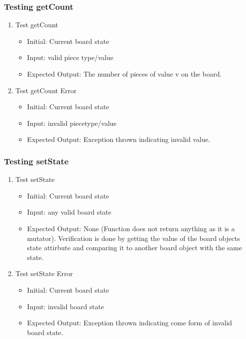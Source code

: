 \documentclass[12pt, titlepage]{article}
\begin{document}
\subsubsection{Testing getCount}
\begin{enumerate}
	\item Test getCount \begin{itemize}
		      \item Initial: Current board state
		      \item Input: valid piece type/value
		      \item Expected Output: The number of pieces of value v on the board.
	      \end{itemize}
	\item Test getCount Error\begin{itemize}
		      \item Initial: Current board state
		      \item Input: invalid piecetype/value
		      \item Expected Output: Exception thrown indicating invalid value.
	      \end{itemize}
\end{enumerate}


\subsubsection{Testing setState}
\begin{enumerate}
	\item Test setState \begin{itemize}
		      \item Initial: Current board state
		      \item Input: any valid board state
		      \item Expected Output: None (Function does not return anything as it is a mutator). Verification is done by getting the value of the board objects state attirbute and comparing it to another board object with the same state.
	      \end{itemize}
	\item Test setState Error\begin{itemize}
		      \item Initial: Current board state
		      \item Input: invalid board state
		      \item Expected Output: Exception thrown indicating come form of invalid board state.
	      \end{itemize}
\end{enumerate}
\end{document}
